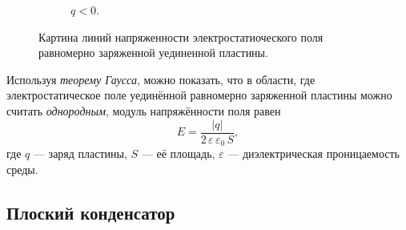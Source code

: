 \documentclass[14pt,a4paper,oneside]{extreport}
\theoremstyle{definition}
\begin{document}
\begin{figure}[H]
\begin{subfigure}{0.48\textwidth}
{%
    }
    \caption{$q<0$.}
      \label{fig:plate-1b}
  \end{subfigure}
  \caption{Картина линий напряженности электростатиоческого поля  равномерно заряженной уединенной пластины. }
  \label{fig:plate-1}
\end{figure}

Используя \textit{теорему Гаусса}, можно показать, что в области, где электростатическое поле уединённой равномерно заряженной пластины можно считать \textit{однородным}, модуль напряжённости поля равен
\begin{equation}
E=\frac{|q|}{2\,\varepsilon\,\varepsilon_0\,S},
\label{eq:field-plate}
\end{equation}
где $q$ — заряд пластины, $S$ — её площадь, $\varepsilon$ — диэлектрическая проницаемость среды.

\subsection*{Плоский конденсатор}
\end{document}
